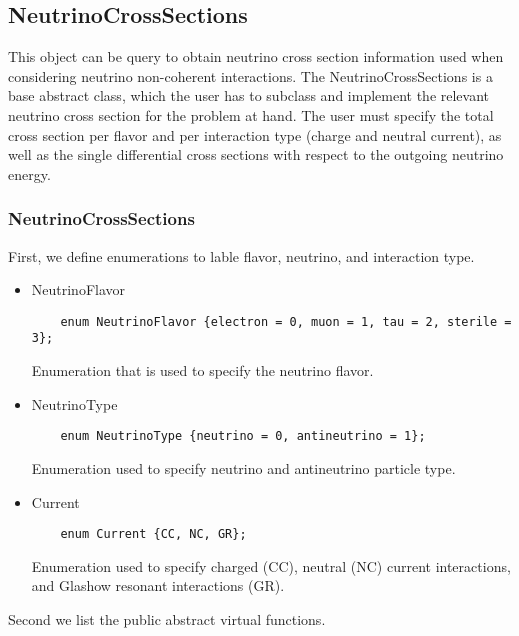 \subsection{NeutrinoCrossSections}

This object can be query to obtain neutrino cross section information used when considering neutrino non-coherent interactions. The {\ttf NeutrinoCrossSections} is a base abstract class, which the user has to subclass and implement the relevant neutrino cross section for the problem at hand. The user must specify the total cross section per flavor and per interaction type (charge and neutral current), as well as the single differential cross sections with respect to the outgoing neutrino energy.

\subsubsection{NeutrinoCrossSections}

First, we define enumerations to lable flavor, neutrino, and interaction type.
\begin{itemize}
  \item {\ttf NeutrinoFlavor}
  \begin{lstlisting}
    enum NeutrinoFlavor {electron = 0, muon = 1, tau = 2, sterile = 3};
 \end{lstlisting}
  Enumeration that is used to specify the neutrino flavor.
  \item {\ttf NeutrinoType}
  \begin{lstlisting}
    enum NeutrinoType {neutrino = 0, antineutrino = 1};
  \end{lstlisting}
  Enumeration used to specify {\ttf neutrino} and {\ttf antineutrino} particle type.
  \item {\ttf Current}
  \begin{lstlisting}
    enum Current {CC, NC, GR};
  \end{lstlisting}
  Enumeration used to specify charged ({\ttf CC}), neutral ({\ttf NC}) current interactions, 
  and Glashow resonant interactions ({\ttf GR}).
\end{itemize}

Second we list the public abstract virtual functions.

